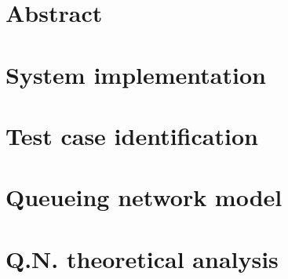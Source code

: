\documentclass[12pt, twoside]{report}
\begin{document}
\tableofcontents
\listoftables
{}
\listoffigures
{}

\chapter*{Abstract}


\chapter{System implementation}
\setcounter{page}{1}


\chapter{Test case identification}


\chapter{Queueing network model}


\chapter{Q.N. theoretical analysis}

\end{document}
